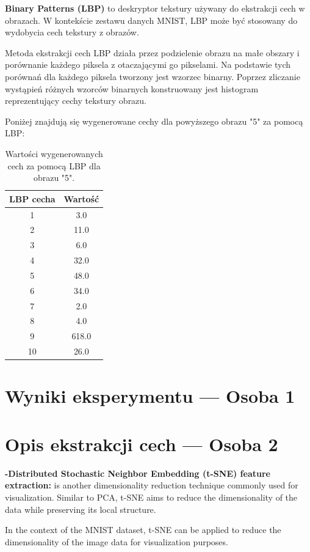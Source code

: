 \documentclass[12pt]{article}
\begin{document}
    \textbf{Binary Patterns (LBP)} to deskryptor tekstury używany do ekstrakcji cech w obrazach. W kontekście zestawu danych MNIST, LBP może być stosowany do wydobycia cech tekstury z obrazów.

    Metoda ekstrakcji cech LBP działa przez podzielenie obrazu na małe obszary i porównanie każdego piksela z otaczającymi go pikselami. Na podstawie tych porównań dla każdego piksela tworzony jest wzorzec binarny. Poprzez zliczanie wystąpień różnych wzorców binarnych konstruowany jest histogram reprezentujący cechy tekstury obrazu.

    Poniżej znajdują się wygenerowane cechy dla powyższego obrazu "5" za pomocą LBP:
    \begin{table}[h]
\centering
\begin{tabular}{|c|c|}
\hline
\textbf{LBP cecha} & \textbf{Wartość} \\
\hline
1 & 3.0 \\
2 & 11.0 \\
3 & 6.0 \\
4 & 32.0 \\
5 & 48.0 \\
6 & 34.0 \\
7 & 2.0 \\
8 & 4.0 \\
9 & 618.0 \\
10 & 26.0 \\
\hline
\end{tabular}
\caption{Wartości wygenerowanych cech za pomocą LBP dla obrazu "5".}
\end{table}

    \pagebreak

    \section{Wyniki eksperymentu --- Osoba 1}
    \pagebreak

    \section{Opis ekstrakcji cech --- Osoba 2}
    \textbf{-Distributed Stochastic Neighbor Embedding (t-SNE) feature extraction:}
    is another dimensionality reduction technique commonly used for visualization. Similar to PCA, t-SNE aims to reduce the dimensionality of the data while preserving its local structure.

    In the context of the MNIST dataset, t-SNE can be applied to reduce the dimensionality of the image data for visualization purposes.
\end{document}
